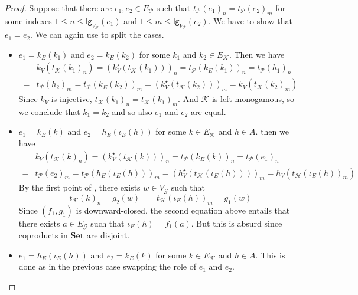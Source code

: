 \documentclass[3p]{elsarticle}
\newcommand{\lgh}{\mathsf{lg}}
\newcommand{\Set}{\mathbf{Set}}
\theoremstyle{remark}
\theoremstyle{definition}
\begin{document}
\begin{proof}
 Suppose that there are $e_1, e_2\in E_{\mathcal{P}}$ such that $t_{\mathcal{P}}(e_1)_n=t_{\mathcal{P}}(e_2)_m$ for some indexes $1\leq n \leq \lgh_{V_{\mathcal{P}}}(e_1)$ and $1\leq m \leq \lgh_{V_{\mathcal{P}}}(e_2)$. We have to show that $e_1=e_2$. We can again use  to split the cases.
 
\begin{itemize}
	\item $e_1=k_E(k_1)$ and $e_2=k_E(k_2)$ for some $k_1$ and $k_2\in E_{\mathcal{K}}$. Then we have
	\begin{align*}
		&k_V(t_{\mathcal{K}}(k_1)_n)=(k^\star_V(t_{\mathcal{K}}(k_1)))_n=t_{\mathcal{P}}(k_E(k_1))_n=t_{\mathcal{P}}(h_1)_n\\=&t_{\mathcal{P}}(h_2)_m=t_{\mathcal{P}}(k_E(k_2))_m=(k^\star_V(t_{\mathcal{K}}(k_2)))_m=k_V(t_{\mathcal{K}}(k_2)_m)
	\end{align*}
	Since $k_V$ is injective, $t_{\mathcal{K}}(k_1)_n=t_{\mathcal{K}}(k_1)_m$. And  $\mathcal{K}$ is left-monogamous, so we conclude that $k_1=k_2$ and so also $e_1$ and $e_2$ are equal.
	\item $e_1=k_E(k)$ and $e_2=h_E(\iota_{E}(h))$ for some $k\in E_{\mathcal{K}}$ and $h\in A$. 
	then we have
	\begin{align*}
		&k_V(t_{\mathcal{K}}(k)_n)= (k^\star_V(t_{\mathcal{K}}(k)))_n=t_{\mathcal{P}}(k_E(k))_n=t_{\mathcal{P}}(e_1)_n\\=&t_{\mathcal{P}}(e_2)_m=t_{\mathcal{P}}(h_E(\iota_E(h)))_m=(h^\star_V(t_{\mathcal{H}}(\iota_E(h))))_m= h_V(t_{\mathcal{H}}(\iota_{E}(h))_m)
	\end{align*}
	By the first point of , there exists $w\in V_{\mathcal{G}}$ such that 
	\[t_{\mathcal{K}}(k)_n=g_2(w) \qquad t_{\mathcal{H}}(\iota_{E}(h))_m=g_1(w)\]
Since $(f_1, g_1)$ is downward-closed, the second equation above entails that there exists $a\in E_{\mathcal{G}}$ such that $\iota_E(h)=f_1(a)$. But this is absurd since coproducts in $\Set$ are disjoint.
	
	\item  $e_1=h_E(\iota_{E}(h))$ and $e_2=k_E(k)$ for some $k\in E_{\mathcal{K}}$ and $h\in A$. This is done as in the previous case swapping the role of $e_1$ and $e_2$.
	

\end{itemize}
\end{proof}
\end{document}
